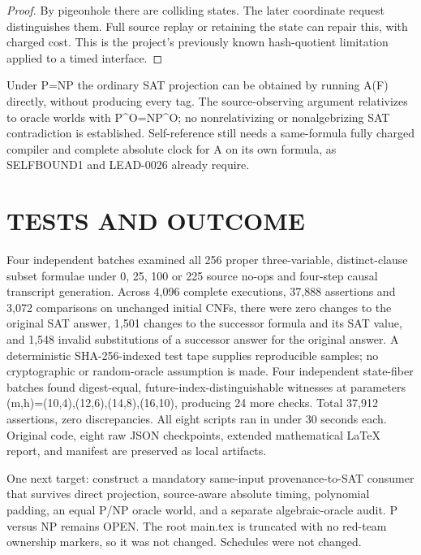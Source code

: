 \documentclass{article}
\begin{document}
\begin{proof}By pigeonhole there are colliding states. The later coordinate request distinguishes them. Full source replay or retaining the state can repair this, with charged cost. This is the project's previously known hash-quotient limitation applied to a timed interface.\end{proof}
Under P=NP the ordinary SAT projection can be obtained by running A(F) directly, without producing every tag. The source-observing argument relativizes to oracle worlds with P^O=NP^O; no nonrelativizing or nonalgebrizing SAT contradiction is established. Self-reference still needs a same-formula fully charged compiler and complete absolute clock for A on its own formula, as SELFBOUND1 and LEAD-0026 already require.
\section{TESTS AND OUTCOME}
Four independent batches examined all 256 proper three-variable, distinct-clause subset formulae under 0, 25, 100 or 225 source no-ops and four-step causal transcript generation. Across 4,096 complete executions, 37,888 assertions and 3,072 comparisons on unchanged initial CNFs, there were zero changes to the original SAT answer, 1,501 changes to the successor formula and its SAT value, and 1,548 invalid substitutions of a successor answer for the original answer. A deterministic SHA-256-indexed test tape supplies reproducible samples; no cryptographic or random-oracle assumption is made. Four independent state-fiber batches found digest-equal, future-index-distinguishable witnesses at parameters (m,h)=(10,4),(12,6),(14,8),(16,10), producing 24 more checks. Total 37,912 assertions, zero discrepancies. All eight scripts ran in under 30 seconds each. Original code, eight raw JSON checkpoints, extended mathematical LaTeX report, and manifest are preserved as local artifacts.

One next target: construct a mandatory same-input provenance-to-SAT consumer that survives direct projection, source-aware absolute timing, polynomial padding, an equal P/NP oracle world, and a separate algebraic-oracle audit. P versus NP remains OPEN. The root main.tex is truncated with no red-team ownership markers, so it was not changed. Schedules were not changed.
\end{document}
